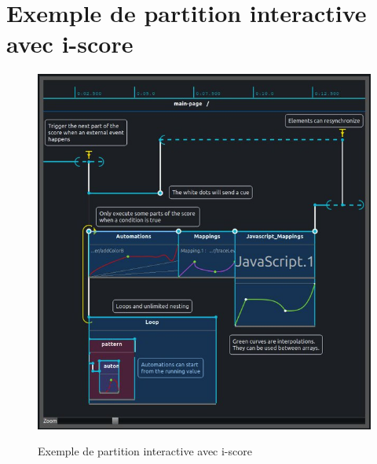 \section{Exemple de partition interactive avec i-score}
\label{sec:exempleIScore}
\begin{figure}[H]
	\centering
	\includegraphics[keepaspectratio=true, width=\textwidth]{Annexes/i/exempleIScore.jpg}
	\caption{Exemple de partition interactive avec i-score}
	\medskip
	\small
	\it  	
	\label{fig:exempleIScore}
\end{figure}

